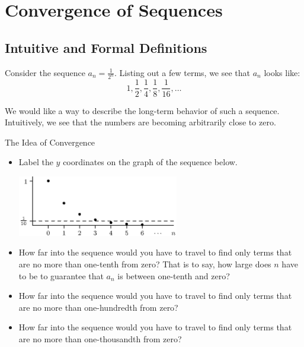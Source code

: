 
\section{Convergence of Sequences}

\subsection{Intuitive and Formal Definitions}\label{convseq}

Consider the sequence $a_n=\frac{1}{2^n}$.  Listing out a few terms, we see that $a_n$ looks like:
$$1,\frac{1}{2},\frac{1}{4},\frac{1}{8},\frac{1}{16},\ldots$$

We would like a way to describe the long-term behavior of such a sequence.  Intuitively, we see that the numbers are becoming arbitrarily close to zero. 

\begin{exercise}{The Idea of Convergence \Coffeecup}
\begin{itemize}
\item Label the $y$ coordinates on the graph of the sequence below.

	\begin{center}
	\includegraphics[width=200pt,height=75pt]{ChapterSeqSer/Figures/convergence1tenth.eps}
	\end{center}

\item How far into the sequence would you have to travel to find only terms that are no more than one-tenth from zero?  That is to say, how large does $n$ have to be to guarantee that $a_n$ is between one-tenth and zero?
\item How far into the sequence would you have to travel to find only terms that are no more than one-hundredth from zero?
\item How far into the sequence would you have to travel to find only terms that are no more than  one-thousandth from zero?
\end{itemize}
\end{exercise}

